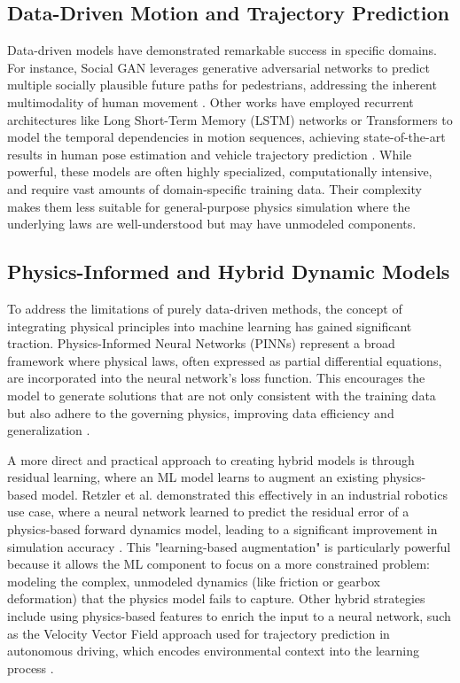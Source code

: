 \documentclass[conference]{IEEEtran}
\begin{document}
\subsection{Data-Driven Motion and Trajectory Prediction}
Data-driven models have demonstrated remarkable success in specific domains. For instance, Social GAN leverages generative adversarial networks to predict multiple socially plausible future paths for pedestrians, addressing the inherent multimodality of human movement \cite{b9}. Other works have employed recurrent architectures like Long Short-Term Memory (LSTM) networks or Transformers to model the temporal dependencies in motion sequences, achieving state-of-the-art results in human pose estimation and vehicle trajectory prediction \cite{b6, b10}. While powerful, these models are often highly specialized, computationally intensive, and require vast amounts of domain-specific training data. Their complexity makes them less suitable for general-purpose physics simulation where the underlying laws are well-understood but may have unmodeled components.

\subsection{Physics-Informed and Hybrid Dynamic Models}
To address the limitations of purely data-driven methods, the concept of integrating physical principles into machine learning has gained significant traction. Physics-Informed Neural Networks (PINNs) represent a broad framework where physical laws, often expressed as partial differential equations, are incorporated into the neural network's loss function. This encourages the model to generate solutions that are not only consistent with the training data but also adhere to the governing physics, improving data efficiency and generalization \cite{b7, b11}.

A more direct and practical approach to creating hybrid models is through residual learning, where an ML model learns to augment an existing physics-based model. Retzler et al. demonstrated this effectively in an industrial robotics use case, where a neural network learned to predict the residual error of a physics-based forward dynamics model, leading to a significant improvement in simulation accuracy \cite{b8}. This "learning-based augmentation" is particularly powerful because it allows the ML component to focus on a more constrained problem: modeling the complex, unmodeled dynamics (like friction or gearbox deformation) that the physics model fails to capture. Other hybrid strategies include using physics-based features to enrich the input to a neural network, such as the Velocity Vector Field approach used for trajectory prediction in autonomous driving, which encodes environmental context into the learning process \cite{b12}.
\end{document}
